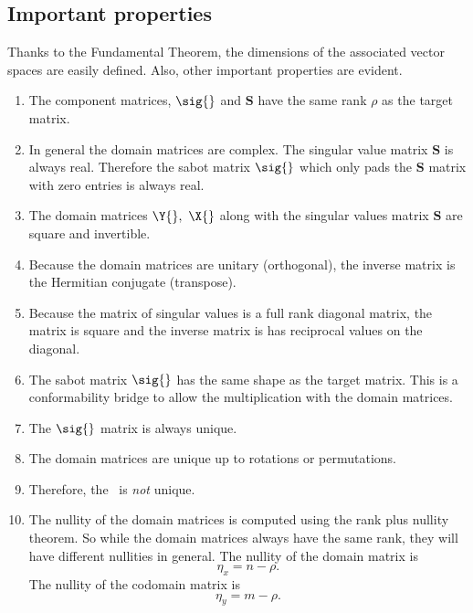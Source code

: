 \subsection{Important properties}
Thanks to the Fundamental Theorem, the dimensions of the associated vector spaces are easily defined. Also, other important properties are evident.
\begin{enumerate}
\item The component matrices, $\sig{}$ and $\textbf{S}$ have the same rank $\rho$ as the target matrix.
\item In general the domain matrices are complex. The singular value matrix $\textbf{S}$ is always real. Therefore the sabot matrix $\sig{}$ which only pads the $\textbf{S}$ matrix with zero entries is always real.
\item The domain matrices $\Y{},\ \X{}$ along with the singular values matrix $\textbf{S}$ are square and invertible.
\item Because the domain matrices are unitary (orthogonal), the inverse matrix is the Hermitian conjugate (transpose).
\item Because the matrix of singular values is a full rank diagonal matrix, the matrix is square and the inverse matrix is has reciprocal values on the diagonal.
\item The sabot matrix $\sig{}$ has the same shape as the target matrix. This is a conformability bridge to allow the multiplication with the domain matrices.
\item The $\sig{}$ matrix is always unique.
\item The domain matrices are unique up to rotations or permutations.
\item Therefore, the \svdl \ is \textit{not} unique.
\item The nullity of the domain matrices is computed using the rank plus nullity theorem. So while the domain matrices always have the same rank, they will have different nullities in general.
\subitem The nullity of the domain matrix is
\begin{equation}
  \eta_{x} = n - \rho.
\end{equation}
\subitem The nullity of the codomain matrix is
\begin{equation}
  \eta_{y} = m - \rho.
\end{equation}
\end{enumerate}

